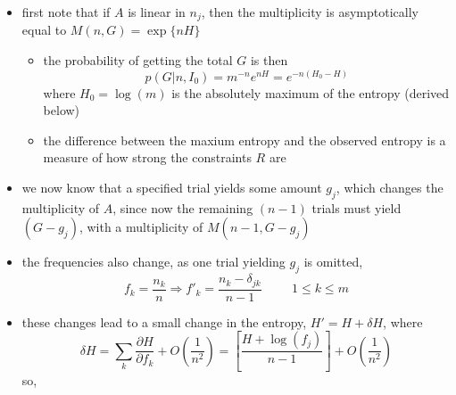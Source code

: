 \documentclass[../jaynes_prob_theory_notes.tex]{subfiles}
\begin{document}
\begin{itemize}
\begin{itemize}
                                \item first note that if $A$ is linear in $n_j$, then the multiplicity is asymptotically equal to $M(n,G) = \exp \{nH \}$
                                    \begin{itemize}
                                            \item the probability of getting the total $G$ is then
                                            \begin{equation*}
                                                p(G|n, I_0) = m^{-n}e^{nH} = e^{-n(H_0 - H)}
                                            \end{equation*}
                                            where $H_0 = \log (m)$ is the absolutely maximum of the entropy (derived below)
                                        \item the difference between the maxium entropy and the observed entropy is a measure of how strong the constraints $R$ are
                                    \end{itemize}
                                \item we now know that a specified trial yields some amount $g_j$, which changes the multiplicity of $A$, since now the remaining $(n-1)$ trials must yield $(G-g_j)$, with a multiplicity of $M(n-1, G-g_j)$
                                \item the frequencies also change, as one trial yielding $g_j$ is omitted,
                                    \begin{equation*}
                                        f_k = \frac{n_k}{n} \Rightarrow {f'}_k = \frac{n_k - {\delta}_{jk}}{n-1} \hspace{1cm} 1 \leq k \leq m
                                    \end{equation*}
                                \item these changes lead to a small change in the entropy, $H' = H + {\delta}H$, where 
                                    \begin{equation*}
                                        {\delta}H = \sum\limits_{k} \frac{\partial H}{\partial f_k} + O \left( \frac{1}{n^2} \right) = \left[ \frac{H + \log (f_j)}{n-1} \right] + O \left(\frac{1}{n^2} \right)
                                    \end{equation*}
                                    so,
                                    \begin{equation*}

\end{equation*}
\end{itemize}
\end{itemize}
\end{document}
